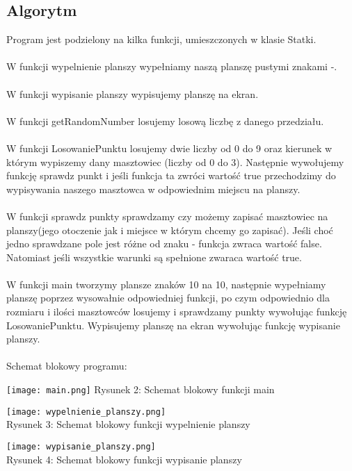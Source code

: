 \documentclass[12pt,a4paper]{article}
\begin{document}
	\subsection*{Algorytm}
	Program jest podzielony na kilka funkcji, umieszczonych w klasie Statki.\\
	\\
	W funkcji wypelnienie planszy wypełniamy naszą planszę pustymi znakami -.\\
	\\
	W funkcji wypisanie planszy wypisujemy planszę na ekran.\\
	\\
	W funkcji getRandomNumber losujemy losową liczbę z danego przedziału.\\
	\\
	W funkcji LosowaniePunktu losujemy dwie liczby od 0 do 9 oraz kierunek w którym wypiszemy dany
	masztowiec (liczby od 0 do 3). Następnie wywołujemy funkcję sprawdz punkt i jeśli funkcja ta zwróci wartość true przechodzimy do wypisywania naszego masztowca w odpowiednim miejscu na planszy.\\
	\\
	W funkcji sprawdz punkty sprawdzamy czy możemy zapisać masztowiec na planszy(jego otoczenie jak i miejsce w którym chcemy go zapisać). Jeśli choć jedno sprawdzane pole jest różne od znaku - funkcja zwraca wartość false. Natomiast jeśli wszystkie warunki są spełnione zwaraca wartość true.\\
	\\
	W funkcji main tworzymy plansze znaków 10 na 10, następnie wypełniamy planszę poprzez wysowałnie odpowiedniej funkcji, po czym odpowiednio dla rozmiaru i ilości masztowców losujemy i sprawdzamy punkty wywołując funkcję LosowaniePunktu. Wypisujemy planszę na ekran wywołując funkcję wypisanie planszy.\\
	\\
	Schemat blokowy programu:
	\begin{center}
	    \texttt{[image: main.png]}
	    Rysunek 2: Schemat blokowy funkcji main
	\end{center}
	\begin{center}
	    \texttt{[image: wypelnienie\_planszy.png]}
	    \\
	    Rysunek 3: Schemat blokowy funkcji wypelnienie planszy
	\end{center}
	\begin{center}
	    \texttt{[image: wypisanie\_planszy.png]}
	    \\
	    Rysunek 4: Schemat blokowy funkcji wypisanie planszy
	\end{center}
\end{document}
